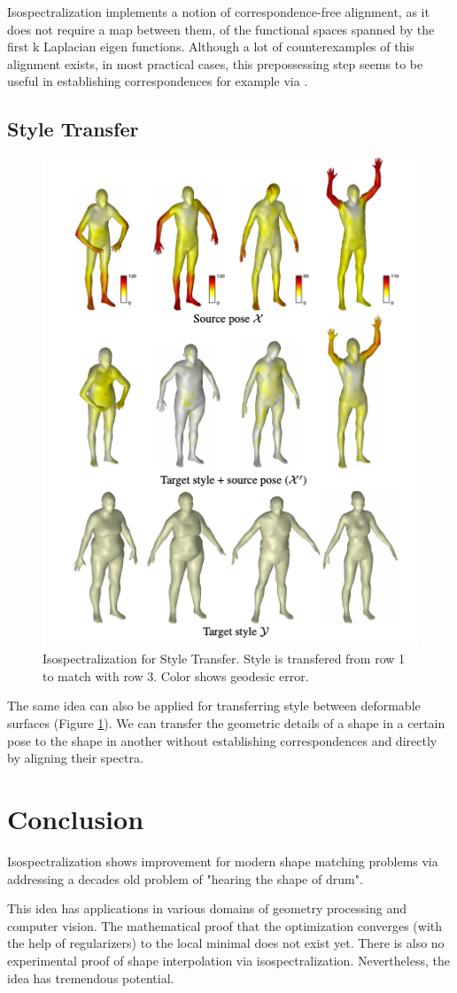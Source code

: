 \documentclass[a4paper,10pt]{article}
\begin{document}
Isospectralization implements
a notion of correspondence-free alignment, as
it does not require a map between them, of the functional spaces spanned by the first k Laplacian eigen functions. Although a lot of counterexamples of this alignment exists, in most practical cases, this prepossessing step seems to be useful in establishing correspondences for example via \cite{ovsjanikov2016computing}.


\subsection{Style Transfer}
\begin{figure}[hbt!]
    \centering
    \includegraphics[height=0.5\textwidth]{Styletransfer.png}
    \caption{Isospectralization for Style Transfer. Style is transfered from row 1 to match with row 3. Color shows geodesic error.}
    \label{fig:styletransfer}
\end{figure}

The same idea can also be applied for transferring style between deformable surfaces (Figure \ref{fig:styletransfer}). We can transfer the geometric details of a shape in a certain pose to the shape in another without establishing correspondences and directly by aligning their spectra.

\section{Conclusion}

Isospectralization shows improvement for modern shape matching problems via addressing a decades old problem of "hearing the shape of drum". 

This idea has applications in various domains of geometry processing and computer vision. The mathematical proof that the optimization converges (with the help of regularizers) to the local minimal does not exist yet. There is also no experimental proof of shape interpolation via isospectralization. Nevertheless, the idea has tremendous potential.

\newpage


\end{document}
